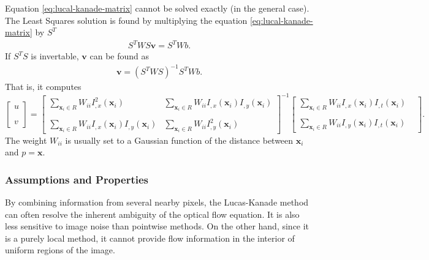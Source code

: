 \documentclass[letterpaper,11pt]{article}
\begin{document}
Equation \eqref{eq:lucal-kanade-matrix} cannot be solved exactly (in the general case). The Least Squares solution is found by multiplying the equation \eqref{eq:lucal-kanade-matrix} by $S^T$
\begin{align}
S^T W S \mathbf{v} = S^T W b.
\label{eq:lucas-kanade-leastsqaure}
\end{align} 
If $S^T S$ is invertable, $\mathbf{v}$ can be found as
\begin{align}
\mathbf{v} = (S^T W S)^{-1} S^T W b.
\label{eq:lucas-kanade-compact-solution}
\end{align}
That is, it computes
\begin{equation}
\begin{bmatrix}
u \\
~\\
\\
v
\end{bmatrix} = 
\begin{bmatrix}
\sum\limits_{\mathbf{x}_i \in R} W_{ii} I_{,x}^2(\mathbf{x}_i) &  \sum\limits_{\mathbf{x}_i \in R} W_{ii} I_{,x}(\mathbf{x}_i)I_{,y}(\mathbf{x}_i) \\ 
& \\
\sum\limits_{\mathbf{x}_i \in R} W_{ii} I_{,x}(\mathbf{x}_i)I_{,y}(\mathbf{x}_i) & \sum\limits_{\mathbf{x}_i \in R} W_{ii} I_{,y}^2(\mathbf{x}_i) 
\end{bmatrix}^{-1} \begin{bmatrix}
\sum\limits_{\mathbf{x}_i \in R} W_{ii} I_{,x}(\mathbf{x}_i) I_{,t}(\mathbf{x}_i) \\
& \\
\sum\limits_{\mathbf{x}_i \in R} W_{ii} I_{,y}(\mathbf{x}_i) I_{,t}(\mathbf{x}_i)
\end{bmatrix}.
\end{equation}
The weight $W_{ii}$ is usually set to a Gaussian function of the distance between $\mathbf{x}_i$ and $p=\mathbf{x}$.
\subsubsection*{Assumptions and Properties}
By combining information from several nearby pixels, the Lucas-Kanade method can often resolve the inherent ambiguity of the optical flow equation. It is also less sensitive to image noise than pointwise methods. On the other hand, since it is a purely local method, it cannot provide flow information in the interior of uniform regions of the image.
\end{document}
